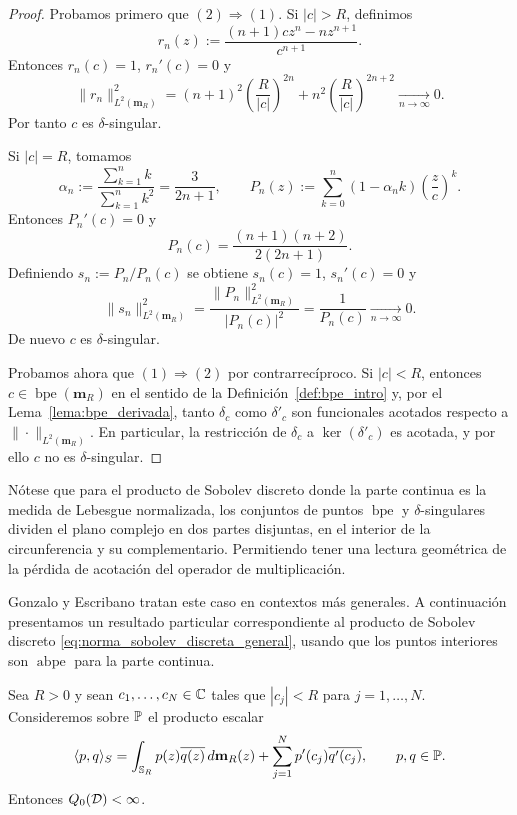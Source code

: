 \begin{proof}
	Probamos primero que $(2)\Rightarrow(1)$. Si $|c|>R$, definimos
	\[
		r_n(z):=\frac{(n+1)c z^n-nz^{n+1}}{c^{n+1}}.
	\]
	Entonces $r_n(c)=1$, $r_n'(c)=0$ y
	\[
		\|r_n\|_{L^2(\mathbf{m}_R)}^2
		=
		(n+1)^2\left(\frac{R}{|c|}\right)^{2n}
		+
		n^2\left(\frac{R}{|c|}\right)^{2n+2}
		\xrightarrow[n\to\infty]{}0.
	\]
	Por tanto $c$ es $\delta$-singular.

	Si $|c|=R$, tomamos
	\[
		\alpha_n:=\frac{\sum_{k=1}^n k}{\sum_{k=1}^n k^2}=\frac{3}{2n+1},
		\qquad
		P_n(z):=\sum_{k=0}^n (1-\alpha_n k)\left(\frac zc\right)^k.
	\]
	Entonces $P_n'(c)=0$ y
	\[
		P_n(c)=\frac{(n+1)(n+2)}{2(2n+1)}.
	\]
	Definiendo $s_n:=P_n/P_n(c)$ se obtiene $s_n(c)=1$, $s_n'(c)=0$ y
	\[
		\|s_n\|_{L^2(\mathbf{m}_R)}^2
		=
		\frac{\|P_n\|_{L^2(\mathbf{m}_R)}^2}{|P_n(c)|^2}
		=
		\frac1{P_n(c)}
		\xrightarrow[n\to\infty]{}0.
	\]
	De nuevo $c$ es $\delta$-singular.

	Probamos ahora que $(1)\Rightarrow(2)$ por contrarrecíproco. Si $|c|<R$, entonces $c\in\operatorname{bpe}(\mathbf{m}_R)$ en el sentido de la Definición~\ref{def:bpe_intro} y, por el Lema~\ref{lema:bpe_derivada}, tanto $\delta_c$ como $\delta'_c$ son funcionales acotados respecto a $\|\cdot\|_{L^2(\mathbf{m}_R)}$. En particular, la restricción de $\delta_c$ a $\ker(\delta'_c)$ es acotada, y por ello $c$ no es $\delta$-singular.
\end{proof}

\begin{rmk}
	Nótese que para el producto de Sobolev discreto donde la parte continua es la medida de Lebesgue normalizada, los conjuntos de puntos $\operatorname{bpe}$ y $\delta$-singulares dividen el plano complejo en dos partes disjuntas, en el interior de la circunferencia y su complementario. Permitiendo tener una lectura geométrica de la pérdida de acotación del operador de multiplicación.
\end{rmk}

Gonzalo y Escribano \cite{EG25-2} tratan este caso en contextos más generales. A continuación presentamos un resultado particular correspondiente al producto de Sobolev discreto \eqref{eq:norma_sobolev_discreta_general}, usando que los puntos interiores son $\operatorname{abpe}$ para la parte continua.

\begin{prop}\label{prop:atomos_interiores_acotado}
	Sea $R>0$ y sean $c_1,\dots,c_N\in\mathbb{C}$ tales que $|c_j|<R$ para $j=1,\dots,N$.
	Consideremos sobre $\mathbb{P}$ el producto escalar
	\[
		\langle p,q\rangle_S
		=
		\int_{\mathbb{S}_R} p(z)\overline{q(z)}\,d\mathbf{m}_R(z)
		+
		\sum_{j=1}^N p'(c_j)\overline{q'(c_j)},
		\qquad p,q\in\mathbb{P}.
	\]
	Entonces $Q_0(\mathcal{D})<\infty$.
\end{prop}

